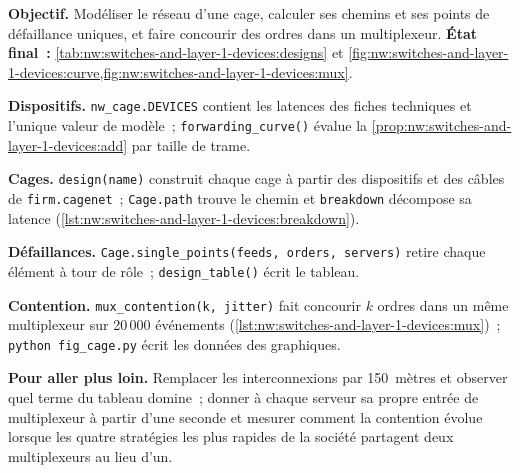 \begin{tutorial}
\textbf{Objectif.} Modéliser le réseau d'une cage, calculer ses chemins et ses points de défaillance uniques, et faire concourir des ordres dans un multiplexeur.
\textbf{État final~:} \cref{tab:nw:switches-and-layer-1-devices:designs} et \cref{fig:nw:switches-and-layer-1-devices:curve,fig:nw:switches-and-layer-1-devices:mux}.
\begin{tutsteps}
\item \textbf{Dispositifs.} \texttt{nw\_cage.DEVICES} contient les latences des fiches techniques et l'unique valeur de modèle~;
  \texttt{forwarding\_curve()} évalue la \cref{prop:nw:switches-and-layer-1-devices:add} par taille de trame.
\item \textbf{Cages.} \texttt{design(name)} construit chaque cage à partir des dispositifs et des câbles de \texttt{firm.cagenet}~; \texttt{Cage.path} trouve le
  chemin et \texttt{breakdown} décompose sa latence (\cref{lst:nw:switches-and-layer-1-devices:breakdown}).
\item \textbf{Défaillances.} \texttt{Cage.single\_points(feeds, orders, servers)} retire chaque élément à tour de rôle~;
  \texttt{design\_table()} écrit le tableau.
\item \textbf{Contention.} \texttt{mux\_contention(k, jitter)} fait concourir $k$ ordres dans un même multiplexeur sur 20\,000 événements
  (\cref{lst:nw:switches-and-layer-1-devices:mux})~; \texttt{python fig\_cage.py} écrit les données des graphiques.
\end{tutsteps}
\textbf{Pour aller plus loin.} Remplacer les interconnexions par 150~mètres et observer quel terme du tableau domine~; donner à chaque serveur
  sa propre entrée de multiplexeur à partir d'une seconde  et mesurer comment la contention évolue lorsque les quatre stratégies les plus rapides de la société
  partagent deux multiplexeurs au lieu d'un.
\end{tutorial}

\label{lst:nw:switches-and-layer-1-devices:breakdown}

\label{lst:nw:switches-and-layer-1-devices:mux}

